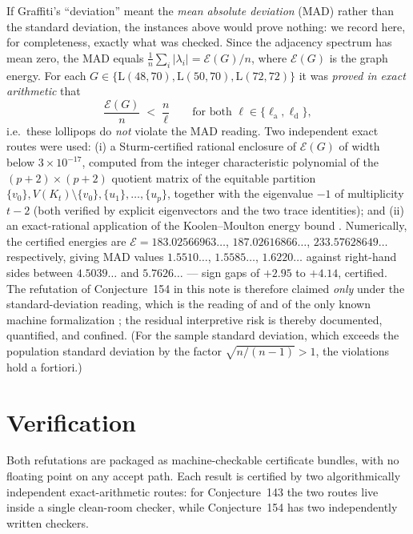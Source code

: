 \documentclass[11pt]{article}
\theoremstyle{remark}
\newcommand{\la}{\ell_{\mathrm{a}}}
\newcommand{\ld}{\ell_{\mathrm{d}}}
\newcommand{\Lol}{\mathrm{L}}
\begin{document}
If Graffiti's ``deviation'' meant the \emph{mean absolute deviation} (MAD)
rather than the standard deviation, the instances above would prove nothing:
we record here, for completeness, exactly what was checked. Since the adjacency
spectrum has mean zero, the MAD equals
$\frac1n \sum_i \lvert\lambda_i\rvert = \mathcal{E}(G)/n$, where
$\mathcal{E}(G)$ is the graph energy. For each
$G \in \{\Lol(48,70), \Lol(50,70), \Lol(72,72)\}$ it was \emph{proved in
exact arithmetic} that
\[
\frac{\mathcal{E}(G)}{n} \;<\; \frac{n}{\ell}
\qquad \text{for both } \ell \in \{\la, \ld\},
\]
i.e.\ these lollipops do \emph{not} violate the MAD reading. Two independent
exact routes were used: (i) a Sturm-certified rational enclosure of
$\mathcal{E}(G)$ of width below $3 \times 10^{-17}$, computed from the
integer characteristic polynomial of the $(p+2)\times(p+2)$ quotient matrix
of the equitable partition $\{v_0\}, V(K_t)\setminus\{v_0\}, \{u_1\}, \dots,
\{u_p\}$, together with the eigenvalue $-1$ of multiplicity $t-2$ (both
verified by explicit eigenvectors and the two trace identities); and (ii) an
exact-rational application of the Koolen--Moulton
energy bound \cite{KoolenMoulton2001}. Numerically, the certified energies
are $\mathcal{E} = 183.02566963\ldots$, $187.02616866\ldots$,
$233.57628649\ldots$ respectively, giving MAD values
$1.5510\ldots$, $1.5585\ldots$, $1.6220\ldots$ against right-hand sides
between $4.5039\ldots$ and $5.7626\ldots$ --- sign gaps of $+2.95$ to
$+4.14$, certified. The refutation of Conjecture~154 in this note is
therefore claimed \emph{only} under the standard-deviation reading, which is
the reading of \cite{FMS1993} and of the only known machine formalization
\cite{RoucairolCazenave2025}; the residual interpretive risk is thereby
documented, quantified, and confined. (For the sample standard deviation,
which exceeds the population standard deviation by the factor
$\sqrt{n/(n-1)} > 1$, the violations hold a fortiori.)

\section{Verification}\label{sec:verification}

Both refutations are packaged as machine-checkable certificate bundles, with
no floating point on any accept path. Each result is certified by two
algorithmically independent exact-arithmetic routes: for Conjecture~143 the
two routes live inside a single clean-room checker, while Conjecture~154 has
two independently written checkers.
\end{document}
